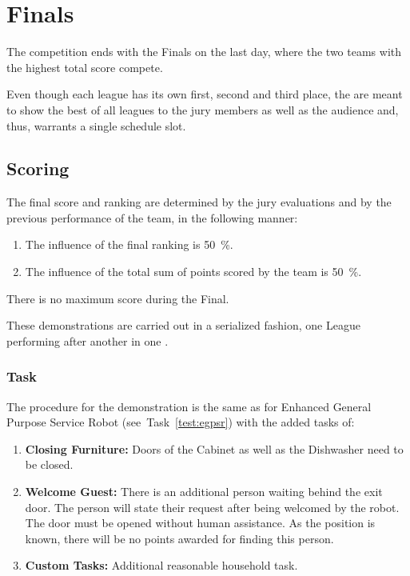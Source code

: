 \chapter{Finals}\label{test:final}

The competition ends with the Finals on the last day, where the two teams with the highest total score compete.

Even though each league has its own first, second and third place, the  are meant to show the best of all leagues to the jury members as well as the audience and, thus, warrants a single schedule slot.

\section{Scoring}
The final score and ranking are determined by the jury evaluations and by the previous performance of the team, in the following manner:

\begin{enumerate}
  \item The influence of the final ranking is \SI{50}{\percent}.
  \item The influence of the total sum of points scored by the team is \SI{50}{\percent}.
\end{enumerate}

There is no maximum score during the Final.

These demonstrations are carried out in a serialized fashion, one League performing after another in one \Arena{}.

\subsection{Task}
The procedure for the demonstration is the same as for Enhanced General Purpose Service Robot (see~Task~\ref{test:egpsr}) with the added tasks of:

\begin{enumerate}[nosep]
  \item \textbf{Closing Furniture:} Doors of the Cabinet as well as the Dishwasher need to be closed.
  \item \textbf{Welcome Guest:} There is an additional person waiting behind the exit door. The person will state their request after being welcomed by the robot. The door must be opened without human assistance. As the position is known, there will be no points awarded for finding this person.
  \item \textbf{Custom Tasks:} Additional reasonable household task.
\end{enumerate}

